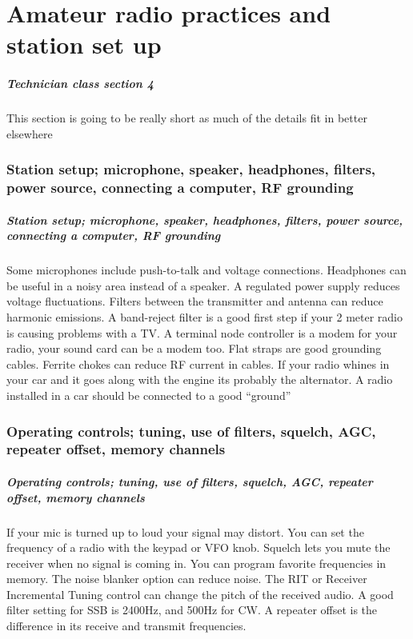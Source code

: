 \documentclass[10pt]{beamer}
\begin{document}
\part{Amateur radio practices and station set up}
\begin{frame}
\frametitle{Technician class section 4}
This section is going to be really short as much of the details fit in better elsewhere
\end{frame}
\section{Station setup; microphone, speaker, headphones, filters, power source, connecting a computer, RF grounding}
\begin{frame}
\frametitle{Station setup; microphone, speaker, headphones, filters, power source, connecting a computer, RF grounding}
Some microphones include push-to-talk and voltage connections. Headphones can be useful in a noisy area instead of a speaker. A regulated power supply reduces voltage fluctuations. Filters between the transmitter and antenna can reduce harmonic emissions. A band-reject filter is a good first step if your 2 meter radio is causing problems with a TV. A terminal node controller is a modem for your radio, your sound card can be a modem too. Flat straps are good grounding cables. Ferrite chokes can reduce RF current in cables. If your radio whines in your car and it goes along with the engine its probably the alternator. A radio installed in a car should be connected to a good ``ground''
\end{frame}

\section{Operating controls; tuning, use of filters, squelch, AGC, repeater offset, memory channels}
\begin{frame}
\frametitle{Operating controls; tuning, use of filters, squelch, AGC, repeater offset, memory channels}
If your mic is turned up to loud your signal may distort. You can set the frequency of a radio with the keypad or VFO knob. Squelch lets you mute the receiver when no signal is coming in. You can program favorite frequencies in memory. The noise blanker option can reduce noise. The RIT or Receiver Incremental Tuning control can change the pitch of the received audio. A good filter setting for SSB is 2400Hz, and 500Hz for CW. A repeater offset is the difference in its receive and transmit frequencies.
\end{frame}
\end{document}
